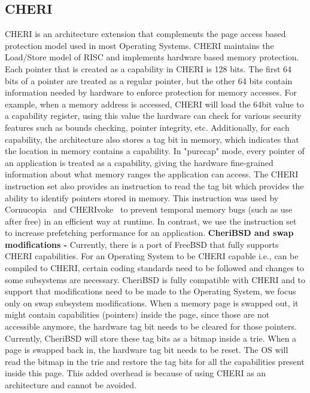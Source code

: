 \subsection{CHERI}
CHERI is an architecture extension that complements the page access based protection model used in most Operating Systems. CHERI maintains the Load/Store model of RISC and implements hardware based memory protection. Each pointer that is created as a capability in CHERI is 128 bits. The first 64 bits of a pointer are treated as a regular pointer, but the other 64 bits contain information needed by hardware to enforce protection for memory accesses. For example, when a memory address is accessed, CHERI will load the 64bit value to a capability register, using this value the hardware can check for various security features such as bounds checking, pointer integrity, etc. Additionally, for each capability, the architecture also stores a tag bit in memory, which indicates that the location in memory contains a capability. In "purecap" mode, every pointer of an application is treated as a capability, giving the hardware fine-grained information about what memory ranges the application can access. The CHERI instruction set also provides an instruction to read the tag bit which provides the ability to identify pointers stored in memory. This instruction was used by Cornucopia~\cite{cornucopia} and CHERIvoke~\cite{cherivoke} to prevent temporal memory bugs (such as use after free) in an efficient way at runtime. In contrast, we use the instruction set to increase prefetching performance for an application. 
\textbf{CheriBSD and swap modifications -} Currently, there is a port of FreeBSD that fully supports CHERI capabilities. For an Operating System to be CHERI capable i.e., can be compiled to CHERI, certain coding standards need to be followed and changes to some subsystems are necessary. CheriBSD is fully compatible with CHERI and to support that modifications need to be made to the Operating System, we focus only on swap subsystem modifications. When a memory page is swapped out, it might contain capabilities (pointers) inside the page, since those are not accessible anymore, the hardware tag bit needs to be cleared for those pointers. Currently, CheriBSD will store these tag bits as a bitmap inside a trie. When a page is swapped back in, the hardware tag bit needs to be reset. The OS will read the bitmap in the trie and restore the tag bits for all the capabilities present inside this page. This added overhead is because of using CHERI as an architecture and cannot be avoided.

